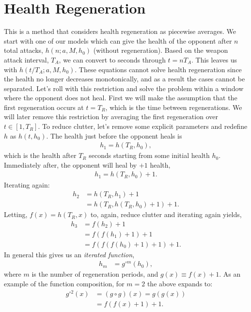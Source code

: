 		\section{Health Regeneration}
			This is a method that considers health regeneration as piecewise averages. We start with one of our models which can give the health of the opponent after $n$ total attacks, $h(n; a, M, h_0)$ (without regeneration). Based on the weapon attack interval, $T_A$, we can convert to seconds through $t = nT_A$. This leaves us with $h(t/T_A; a, M, h_0)$. These equations cannot solve health regeneration since the health no longer decreases monotonically, and as a result the cases cannot be separated. Let's roll with this restriction and solve the problem within a window where the opponent does not heal. First we will make the assumption that the first regeneration occurs at $t=T_R$, which is the time between regenerations. We will later remove this restriction by averaging the first regeneration over $t\in[1, T_R]$. To reduce clutter, let's remove some explicit parameters and redefine $h$ as $h(t, h_0)$. The health just before the opponent heals is
			\begin{align}
				h_1 = h(T_R, h_{0}),
			\end{align}
			which is the health after $T_R$ seconds starting from some initial health $h_0$. Immediately after, the opponent will heal by $+1$ health,
			\begin{align}
				h_1 = h(T_R, h_{0}) + 1.
			\end{align}
			Iterating again:
			\begin{align}
				h_2 &= h(T_R, h_1) + 1 \\
					&= h(T_R, h(T_R, h_0) + 1) + 1.
			\end{align}
			Letting, $f(x)=h(T_R, x)$ to, again, reduce clutter and iterating again yields,
			\begin{align}
				h_3 &= f(h_2) + 1 \\
					&= f(f(h_1) + 1) + 1 \\
					&= f(f(f(h_0) + 1) + 1) + 1.
			\end{align}
			In general this gives us an \textit{iterated function},
			\begin{align}
				h_m &= g^{\circ m}(h_0),
			\end{align}
			where $m$ is the number of regeneration periods, and $g(x) \equiv f(x) + 1$. As an example of the function composition, for $m=2$ the above expands to:
			\begin{align}
				g^{\circ 2}(x)&=(g\circ g)(x)=g(g(x)) \\
							&=f(f(x) + 1) + 1.
			\end{align}
